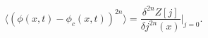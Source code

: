 \begin{equation}
\langle (\phi(x,t)-\phi_c(x,t)) ^{2n} \rangle = \frac{\delta ^{2n}
Z[j]}{\delta j^{2n} (x)} |_{j=0}.
\end{equation}

